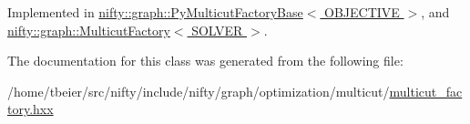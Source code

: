 Implemented in \hyperlink{classnifty_1_1graph_1_1PyMulticutFactoryBase_a199dade0360b83782ee98f630d5e6c59}{nifty\+::graph\+::\+Py\+Multicut\+Factory\+Base$<$ O\+B\+J\+E\+C\+T\+I\+V\+E $>$}, and \hyperlink{classnifty_1_1graph_1_1MulticutFactory_abb9450b461402e0f028c2e55a75d907a}{nifty\+::graph\+::\+Multicut\+Factory$<$ S\+O\+L\+V\+E\+R $>$}.



The documentation for this class was generated from the following file\+:\begin{DoxyCompactItemize}
\item 
/home/tbeier/src/nifty/include/nifty/graph/optimization/multicut/\hyperlink{multicut__factory_8hxx}{multicut\+\_\+factory.\+hxx}\end{DoxyCompactItemize}
